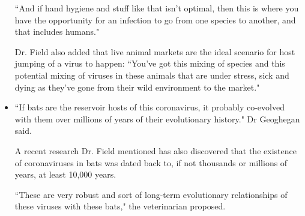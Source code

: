 \begin{itemize}
        \par ``And if hand hygiene and stuff like that isn't optimal, then this is where you have the opportunity for an infection to go from one species to another, and that includes humans."
        \par Dr. Field also added that live animal markets are the ideal scenario for host jumping of a virus to happen:
        ``You've got this mixing of species and this potential mixing of viruses in these animals that are under stress, sick and dying as they've gone from their wild environment to the market."
        \item ``If bats are the reservoir hosts of this coronavirus, it probably co-evolved with them over millions of years of their evolutionary history." Dr Geoghegan said.
        \par A recent research Dr. Field mentioned has also discovered that the existence of coronaviruses in bats was dated back to, if not thousands or millions of years, at least 10,000 years.
        \par ``These are very robust and sort of long-term evolutionary relationships of these viruses with these bats," the veterinarian proposed.
      \end{itemize}

